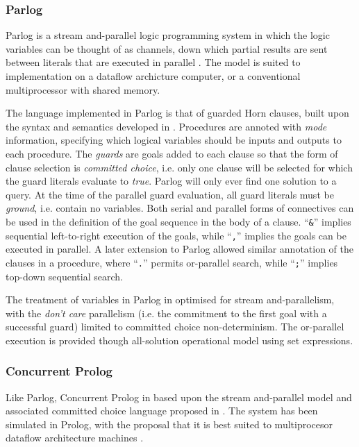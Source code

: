 \subsubsection{Parlog}


Parlog is a stream and-parallel logic programming system in which the logic
variables can be thought of as channels, down which partial results are sent between
literals that are executed in parallel \cite{CG84}.  The model is suited to
implementation on a dataflow archicture computer, or a conventional multiprocessor
with shared memory.

The language implemented in Parlog is that of guarded Horn clauses, built upon the
syntax and semantics developed in \cite{CG81}.  Procedures are annoted with \textit{mode}
information, specifying which logical variables should be inputs and outputs to each
procedure. The \textit{guards} are goals added to each clause so that the form of
clause selection is \textit{committed choice}, i.e. only one clause will be selected for
which the guard literals evaluate to \textit{true}.  Parlog will only ever find one
solution to a query.
At the time of the parallel guard evaluation, all guard literals must be
\textit{ground}, i.e. contain no variables.  Both serial and parallel forms
of connectives can be used in the definition of the goal sequence in the body of 
a clause. ``\texttt{\&}'' implies sequential left-to-right execution of the goals, while
``\texttt{,}'' implies the goals can be executed in parallel.  A later extension to
Parlog allowed similar annotation of the clauses in a procedure, where ``\texttt{.}'' 
permits or-parallel search, while ``\texttt{;}'' implies top-down sequential search.

The treatment of variables in Parlog in optimised for stream and-parallelism, with
the \textit{don't care} parallelism (i.e. the commitment to the first goal with a
successful guard) limited to committed choice non-determinism.  The or-parallel
execution is provided though all-solution operational model using set expressions.

\subsubsection{Concurrent Prolog}


Like Parlog, Concurrent Prolog in based upon the stream and-parallel model and
associated committed choice language proposed in \cite{CG81}.  The system has
been simulated in Prolog, with the proposal that it is best suited to multiprocesor
dataflow architecture machines \cite{Sha87a}.


